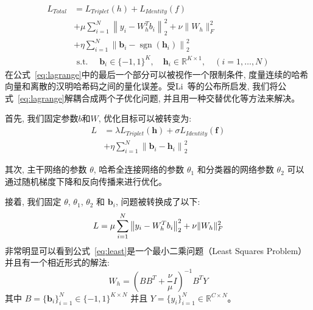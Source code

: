 \begin{equation}
    \begin{aligned}
L_{Total} &= L_{Triplet}(h) + L_{Identity}(f) \\
&+\mu \sum_{i=1}^{N}\left\|y_{i}-W^{T}_h b_{i}\right\|_{2}^{2}+\nu\|W_h\|_{F}^{2} \\ 
     &+ \eta \sum_{i=1}^{N}\left\|\mathbf{b}_{i}-\operatorname{sgn}\left(\mathbf{h}_{i}\right)\right\|_{2}^{2} \\
&\text { s.t. } \quad \mathbf{b}_{i} \in \{-1,1\}^K, \quad \mathbf{h}_{i} \in \mathbb{R}^{K \times 1}, \quad(i=1, \ldots, N)
\end{aligned}
\label{eq:lagrange}
\end{equation}
在公式~\ref{eq:lagrange}中的最后一个部分可以被视作一个限制条件, 度量连续的哈希向量和离散的汉明哈希码之间的量化误差。受Li~\cite{li2017deep}等的公布所启发, 我们将公式~\ref{eq:lagrange}解耦合成两个子优化问题, 并且用一种交替优化等方法来解决。 \par
首先, 我们固定参数$b$和$W$, 优化目标可以被转变为:
\begin{equation}
    \begin{aligned}
        L &= \lambda L_{Triplet}(\mathbf{h}) + \sigma L_{Identity}(\mathbf{f}) \\
        &+ \eta \sum_{i=1}^{N}\left\|\mathbf{b}_{i}-\mathbf{h}_{i}\right\|_{2}^{2}
    \end{aligned}
    \label{eq:sgd}
    \end{equation} \par
其次, 主干网络的参数 $\theta$, 哈希全连接网络的参数 $\theta_1$ 和分类器的网络参数 $\theta_2$ 可以通过随机梯度下降和反向传播来进行优化。\par
接着, 我们固定  $\theta$, $\theta_1$, $\theta_2$ 和 $\mathbf{b}_i$, 问题被转换成了以下:
\begin{equation}
    L = \mu \sum_{i=1}^{N}\left\|y_{i}-W_h^{T} b_{i}\right\|_{2}^{2}+\nu\|W_h\|_{F}^{2} \\ 
    \label{eq:least}
\end{equation}
非常明显可以看到公式~\ref{eq:least}是一个最小二乘问题（Least Squares Problem）并且有一个相近形式的解法:
\begin{equation}
    W_h=\left(B B^{T}+\frac{\nu}{\mu} I\right)^{-1} B^{T} Y
    \label{eq:least1}
\end{equation}
其中 $B = \{\mathbf{b}_i\}_{i=1}^N \in\{-1,1\}^{K \times N}$ 并且 $Y = \{y_i\}^N_{i=1} \in \mathbb{R}^{C \times N}$。\par

